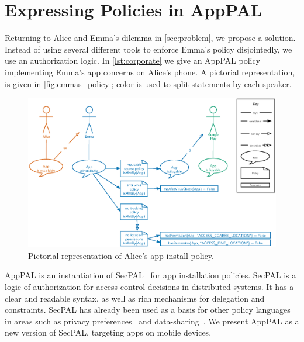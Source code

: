 \documentclass[a4paper]{scrartcl}
\begin{document}
\section{Expressing Policies in AppPAL}
\label{sec:idea}

Returning to Alice and Emma's dilemma in \autoref{sec:problem}, we propose a solution.
Instead of using several different tools to enforce Emma's policy disjointedly, we use an authorization logic.
In \autoref{lst:corporate} we give an AppPAL policy implementing Emma's app concerns on Alice's phone.
A pictorial representation, is given in \autoref{fig:emmas_policy}; color is used to split statements by each speaker.

\begin{figure}
  \includegraphics{figures/bob-policy.eps}
  \caption{Pictorial representation of Alice's app install policy.}
\label{fig:emmas_policy}
\end{figure}

AppPAL is an instantiation of SecPAL~\citep{Becker:2006vh} for app installation policies. 
SecPAL is a logic of authorization for access control decisions in distributed systems.
It has a clear and readable syntax, as well as rich mechanisms for delegation and constraints.
SecPAL has already been used as a basis for other policy languages in areas such as privacy preferences~\citep{Becker:2009ula} and data-sharing~\citep{Aziz:2011vt}.
We present AppPAL as a new version of SecPAL, targeting apps on mobile devices.
\end{document}
